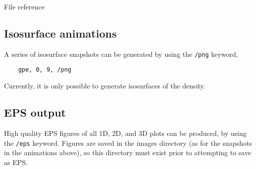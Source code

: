 \begin{chapter}{\label{cha:file_reference}File reference}
  \subsection{Isosurface animations}
  A series of isosurface snapshots can be generated by using the \verb"/png"
  keyword, \eg
  \begin{Verbatim}
    gpe, 0, 9, /png
  \end{Verbatim}
  Currently, it is only possible to generate isosurfaces of the density.

  \subsection{EPS output}
  High quality EPS figures of all 1D, 2D, and 3D plots can be produced, by
  using the \verb"/eps" keyword.  Figures are saved in the images directory (as
  for the snapshots in the animations above), so this directory must exist
  prior to attempting to save as EPS.

\end{chapter}
